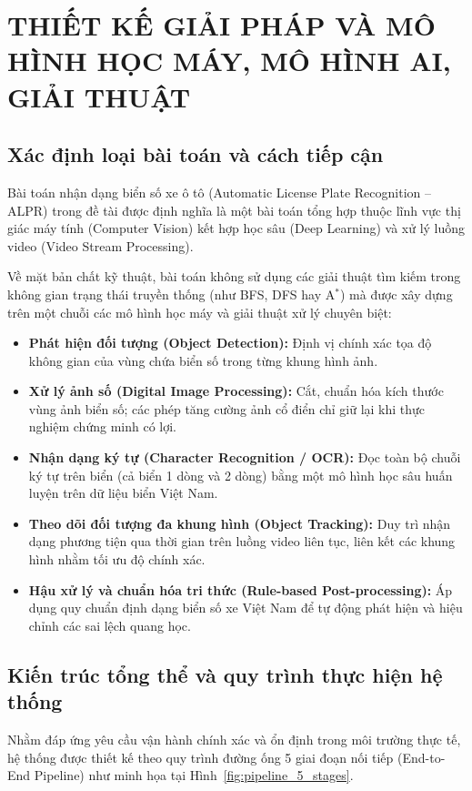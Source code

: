 \chapter{THIẾT KẾ GIẢI PHÁP VÀ MÔ HÌNH HỌC MÁY, MÔ HÌNH AI, GIẢI THUẬT}

\section{Xác định loại bài toán và cách tiếp cận}

Bài toán nhận dạng biển số xe ô tô (Automatic License Plate Recognition -- ALPR) trong đề tài được định nghĩa là một bài toán tổng hợp thuộc lĩnh vực thị giác máy tính (Computer Vision) kết hợp học sâu (Deep Learning) và xử lý luồng video (Video Stream Processing).

Về mặt bản chất kỹ thuật, bài toán không sử dụng các giải thuật tìm kiếm trong không gian trạng thái truyền thống (như BFS, DFS hay A$^*$) mà được xây dựng trên một chuỗi các mô hình học máy và giải thuật xử lý chuyên biệt:

\begin{itemize}
  \item \textbf{Phát hiện đối tượng (Object Detection):} Định vị chính xác tọa độ không gian của vùng chứa biển số trong từng khung hình ảnh.
  \item \textbf{Xử lý ảnh số (Digital Image Processing):} Cắt, chuẩn hóa kích thước vùng ảnh biển số; các phép tăng cường ảnh cổ điển chỉ giữ lại khi thực nghiệm chứng minh có lợi.
  \item \textbf{Nhận dạng ký tự (Character Recognition / OCR):} Đọc toàn bộ chuỗi ký tự trên biển (cả biển 1 dòng và 2 dòng) bằng một mô hình học sâu huấn luyện trên dữ liệu biển Việt Nam.
  \item \textbf{Theo dõi đối tượng đa khung hình (Object Tracking):} Duy trì nhận dạng phương tiện qua thời gian trên luồng video liên tục, liên kết các khung hình nhằm tối ưu độ chính xác.
  \item \textbf{Hậu xử lý và chuẩn hóa tri thức (Rule-based Post-processing):} Áp dụng quy chuẩn định dạng biển số xe Việt Nam để tự động phát hiện và hiệu chỉnh các sai lệch quang học.
\end{itemize}

\section{Kiến trúc tổng thể và quy trình thực hiện hệ thống}

Nhằm đáp ứng yêu cầu vận hành chính xác và ổn định trong môi trường thực tế, hệ thống được thiết kế theo quy trình đường ống 5 giai đoạn nối tiếp (End-to-End Pipeline) như minh họa tại Hình~\ref{fig:pipeline_5_stages}.

